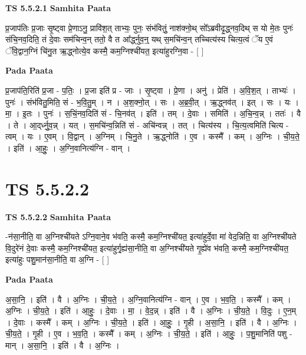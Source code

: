 \documentclass[17pt]{extarticle}
\begin{document}
\textbf{TS 5.5.2.1 } \newline
\textbf{Samhita Paata} \newline

प्र॒जाप॑तिः प्र॒जाः सृ॒ष्ट्वा प्रे॒णाऽनु॒ प्रावि॑श॒त् ताभ्यः॒ पुनः॒ संभ॑वितुं॒ नाश॑क्नो॒थ् सो᳚ऽब्रवीदृ॒द्ध्नव॒दिथ् स यो मे॒तः पुनः॑ संचि॒नव॒दिति॒ तं दे॒वाः सम॑चिन्व॒न् ततो॒ वै त आ᳚र्द्ध्नुव॒न्॒ यथ् स॒मचि॑न्व॒न् तच्चित्य॑स्य चित्य॒त्वं ॅय ए॒वं ॅवि॒द्वान॒ग्निं चि॑नु॒त ऋ॒द्ध्नोत्ये॒व कस्मै॒ कम॒ग्निश्ची॑यत॒ इत्या॑हुरग्नि॒वा - [  ] \newline

\textbf{Pada Paata} \newline

प्र॒जाप॑ति॒रिति॑ प्र॒जा - प॒तिः॒ । प्र॒जा इति॑ प्र - जाः । सृ॒ष्ट्वा । प्रे॒णा । अनु॑ । प्रेति॑ । अ॒वि॒श॒त् । ताभ्यः॑ । पुनः॑ । संभ॑वितु॒मिति॒ सं - भ॒वि॒तु॒म् । न । अ॒श॒क्नो॒त् । सः । अ॒ब्र॒वी॒त् । ऋ॒द्ध्नव॑त् । इत् । सः । यः । मा॒ । इ॒तः । पुनः॑ । स॒चिं॒नव॒दिति॑ सं - चि॒नव॑त् । इति॑ । तम् । दे॒वाः । समिति॑ । अ॒चि॒न्व॒न्न् । ततः॑ । वै । ते । आ॒द्‌र्ध्नु॒व॒न्न् । यत् । स॒मचि॑न्व॒न्निति॑ सं - अचि॑न्वन्न् । तत् । चित्य॑स्य । चि॒त्य॒त्वमिति॑ चित्य - त्वम् । यः । ए॒वम् । वि॒द्वान् । अ॒ग्निम् । चि॒नु॒ते । ऋ॒द्ध्नोति॑ । ए॒व । कस्मै᳚ । कम् । अ॒ग्निः । ची॒य॒ते॒ । इति॑ । आ॒हुः॒ । अ॒ग्नि॒वानित्य॑ग्नि - वान् ।  \newline




\section*{ TS 5.5.2.2 }

\textbf{TS 5.5.2.2 } \newline
\textbf{Samhita Paata} \newline

-न॑सा॒नीति॒ वा अ॒ग्निश्ची॑यते ऽग्नि॒वाने॒व भ॑वति॒ कस्मै॒ कम॒ग्निश्ची॑यत॒ इत्या॑हुर्दे॒वा मा॑ वेद॒न्निति॒ वा अ॒ग्निश्ची॑यते वि॒दुरे॑नं दे॒वाः कस्मै॒ कम॒ग्निश्ची॑यत॒ इत्या॑हुर्गृ॒ह्य॑सा॒नीति॒ वा अ॒ग्निश्ची॑यते गृ॒ह्ये॑व भ॑वति॒ कस्मै॒ कम॒ग्निश्ची॑यत॒ इत्या॑हुः पशु॒मान॑सा॒नीति॒ वा अ॒ग्नि - [  ] \newline

\textbf{Pada Paata} \newline

अ॒सा॒नि॒ । इति॑ । वै । अ॒ग्निः । ची॒य॒ते॒ । अ॒ग्नि॒वानित्य॑ग्नि - वान् । ए॒व । भ॒व॒ति॒ । कस्मै᳚ । कम् । अ॒ग्निः । ची॒य॒ते॒ । इति॑ । आ॒हुः॒ । दे॒वाः । मा॒ । वे॒द॒न्न् । इति॑ । वै । अ॒ग्निः । ची॒य॒ते॒ । वि॒दुः । ए॒न॒म् । दे॒वाः । कस्मै᳚ । कम् । अ॒ग्निः । ची॒य॒ते॒ । इति॑ । आ॒हुः॒ । गृ॒ही । अ॒सा॒नि॒ । इति॑ । वै । अ॒ग्निः । ची॒य॒ते॒ । गृ॒ही । ए॒व । भ॒व॒ति॒ । कस्मै᳚ । कम् । अ॒ग्निः । ची॒य॒ते॒ । इति॑ । आ॒हुः॒ । प॒शु॒मानिति॑ पशु - मान् । अ॒सा॒नि॒ । इति॑ । वै । अ॒ग्निः ।  \newline
\end{document}
